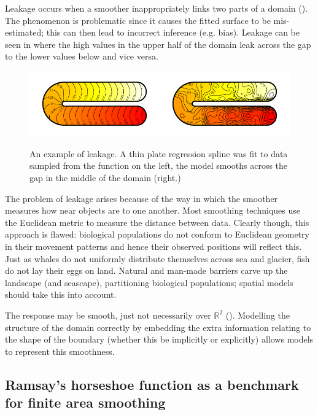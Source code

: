 Leakage occurs when a smoother inappropriately links two parts of a domain (\cite{soap}). The phenomenon is problematic since it causes the fitted surface to be mis-estimated; this can then lead to incorrect inference (e.g. bias). Leakage can be seen in  where the high values in the upper half of the domain leak across the gap to the lower values below and vice versa.

\begin{figure}
\centering
\includegraphics{intro/figs/ramsay-leak.pdf}\\
\caption{An example of leakage. A thin plate regression spline was fit to data sampled from the function on the left, the model smooths across the gap in the middle of the domain (right.)}
\label{leakage}
\end{figure}

The problem of leakage arises because of the way in which the smoother measures how near objects are to one another. Most smoothing techniques use the Euclidean metric to measure the distance between data. Clearly though, this approach is flawed: biological populations do not conform to Euclidean geometry in their movement patterns and hence their observed positions will reflect this. Just as whales do not uniformly distribute themselves across sea and glacier, fish do not lay their eggs on land. Natural and man-made barriers carve up the landscape (and seascape), partitioning biological populations; spatial models should take this into account. 

The response may be smooth, just not necessarily over $\mathbb{R}^2$ (\cite{wangranalli}). Modelling the structure of the domain correctly by embedding the extra information relating to the shape of the boundary (whether this be implicitly or explicitly) allows models to represent this smoothness.

\subsection{Ramsay's horseshoe function as a benchmark for finite area smoothing}


